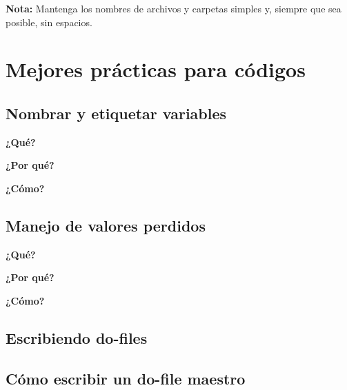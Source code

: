 \documentclass[11pt,en]{elegantpaper}
\begin{document}
\textbf{Nota:} Mantenga los nombres de archivos y carpetas simples y, siempre que sea posible, sin espacios.

\newpage 
\section{Mejores prácticas para códigos}
\label{sec:practicas}

\subsection{Nombrar y etiquetar variables}
\label{sec:variables}

\textbf{¿Qué?}


\textbf{¿Por qué?} 


\textbf{¿Cómo?} 

\subsection{Manejo de valores perdidos}
\label{sec:missings}

\textbf{¿Qué?}


\textbf{¿Por qué?}


\textbf{¿Cómo?}

\subsection{Escribiendo do-files}
\label{sec:dofiles}

\subsection{Cómo escribir un do-file maestro}
\label{sec:domaestro}
\end{document}
